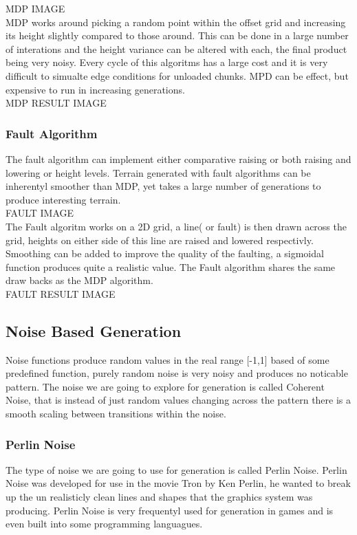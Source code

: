 MDP IMAGE\\

MDP works around picking a random point within the offset grid and increasing its
height slightly compared to those around. This can be done in a large number of 
interations and the height variance can be altered with each, the final product 
being very noisy. Every cycle of this algoritms has a large cost and it is very
difficult to simualte edge conditions for unloaded chunks. MPD can be effect, but
expensive to run in increasing generations.\\

MDP RESULT IMAGE\\

\subsubsection*{Fault Algorithm}
The fault algorithm can implement either comparative raising or both raising and
lowering or height levels. Terrain generated with fault algorithms can be 
inherentyl smoother than MDP, yet takes a large number of generations to produce
interesting terrain.\\

FAULT IMAGE\\

The Fault algoritm works on a 2D grid, a line( or fault) is then drawn across the
grid, heights on either side of this line are raised and lowered respectivly.
Smoothing can be added to improve the quality of the faulting, a sigmoidal 
function produces quite a realistic value. The Fault algorithm shares the same
draw backs as the MDP algorithm.\\

FAULT RESULT IMAGE\\

\subsection{Noise Based Generation}
Noise functions produce random values in the real range [-1,1] based of some 
predefined function, purely random noise is very noisy and produces no noticable
pattern. The noise we are going to explore for generation is called Coherent
Noise, that is instead of just random values changing across the pattern there 
is a smooth scaling between transitions within the noise.\\

\subsubsection*{Perlin Noise}
The type of noise we are going to use for generation is called Perlin Noise. 
Perlin Noise was developed for use in the movie Tron by Ken Perlin, he wanted to
break up the un realisticly clean lines and shapes that the graphics system was
producing. Perlin Noise is very frequentyl used for generation in games and is 
even built into some programming languagues.\\

